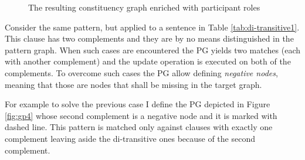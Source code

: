     \begin{figure}[!ht]
        \centering
        \caption{The resulting constituency graph enriched with participant roles}
        \label{fig:cgg-transitive1}
    \end{figure}

    Consider the same pattern, but applied to a sentence in Table \ref{tab:di-transitive1}. This clause has two complements and they are by no means distinguished in the pattern graph. When such cases are encountered the PG yields two matches (each with another complement) and the update operation is executed on both of the complements. To overcome such cases the  PG allow defining \textit{negative nodes}, meaning that those are nodes that shall be missing in the target graph.

    For example to solve the previous case I define the PG depicted in Figure \ref{fig:gp4} whose second complement is a negative node and it is marked with dashed line. This pattern is matched only against clauses with exactly one complement leaving aside the di-transitive ones because of the second complement.

